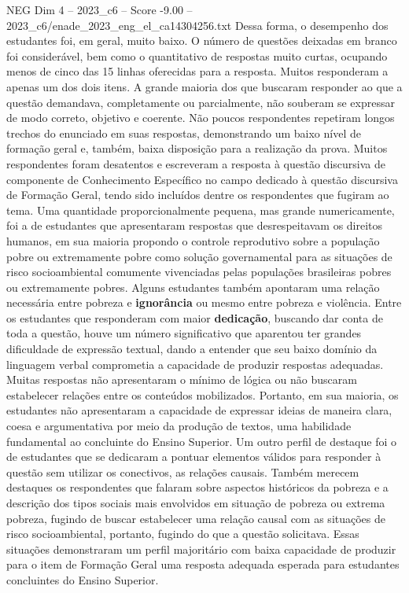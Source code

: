 \begin{textsample}{NEG Dim 4 – 2023\_c6 – Score -9.00 – 2023\_c6/enade\_2023\_eng\_el\_ca14304256.txt}
Dessa forma, o desempenho dos estudantes foi, em geral, muito baixo.
O número de questões deixadas em branco foi considerável, bem como o quantitativo de respostas muito curtas, ocupando menos de cinco das 15 linhas oferecidas para a resposta.
Muitos responderam a apenas um dos dois itens.
A grande maioria dos que buscaram responder ao que a questão demandava, completamente ou parcialmente, não souberam se expressar de modo correto, objetivo e coerente.
Não poucos respondentes repetiram longos trechos do enunciado em suas respostas, demonstrando um baixo nível de formação geral e, também, baixa disposição para a realização da prova.
Muitos respondentes foram desatentos e escreveram a resposta à questão discursiva de componente de Conhecimento Específico no campo dedicado à questão discursiva de Formação Geral, tendo sido incluídos dentre os respondentes que fugiram ao tema.
Uma quantidade proporcionalmente pequena, mas grande numericamente, foi a de estudantes que apresentaram respostas que desrespeitavam os direitos humanos, em sua maioria propondo o controle reprodutivo sobre a população pobre ou extremamente pobre como solução governamental para as situações de risco socioambiental comumente vivenciadas pelas populações brasileiras pobres ou extremamente pobres.
Alguns estudantes também apontaram uma relação necessária entre pobreza e \textbf{ignorância} ou mesmo entre pobreza e violência.
Entre os estudantes que responderam com maior \textbf{dedicação}, buscando dar conta de toda a questão, houve um número significativo que aparentou ter grandes dificuldade de expressão textual, dando a entender que seu baixo domínio da linguagem verbal comprometia a capacidade de produzir respostas adequadas.
Muitas respostas não apresentaram o mínimo de lógica ou não buscaram estabelecer relações entre os conteúdos mobilizados.
Portanto, em sua maioria, os estudantes não apresentaram a capacidade de expressar ideias de maneira clara, coesa e argumentativa por meio da produção de textos, uma habilidade fundamental ao concluinte do Ensino Superior.
Um outro perfil de destaque foi o de estudantes que se dedicaram a pontuar elementos válidos para responder à questão sem utilizar os conectivos, as relações causais.
Também merecem destaques os respondentes que falaram sobre aspectos históricos da pobreza e a descrição dos tipos sociais mais envolvidos em situação de pobreza ou extrema pobreza, fugindo de buscar estabelecer uma relação causal com as situações de risco socioambiental, portanto, fugindo do que a questão solicitava.
Essas situações demonstraram um perfil majoritário com baixa capacidade de produzir para o item de Formação Geral uma resposta adequada esperada para estudantes concluintes do Ensino Superior.

\end{textsample}
